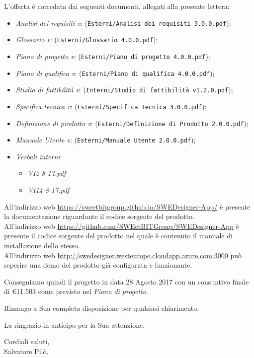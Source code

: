 	L'offerta è corredata dai seguenti documenti, allegati alla presente lettera:
	\begin{itemize}
		\item \emph{Analisi dei requisiti v\VersioneAR{}}: (\verb|Esterni/Analisi dei requisiti 3.0.0.pdf|);
		\item \emph{Glossario v\VersioneG{}}: (\verb|Esterni/Glossario 4.0.0.pdf|);
		\item \emph{Piano di progetto v\VersionePP{}}: (\verb|Esterni/Piano di progetto 4.0.0.pdf|);
		\item \emph{Piano di qualifica v\VersionePQ{}}: (\verb|Esterni/Piano di qualifica 4.0.0.pdf|);
		\item \emph{Studio di fattibilità v\VersioneSF{}}: (\verb|Interni/Studio di fattibilità v1.2.0.pdf|);
		\item \emph{Specifica tecnica v\VersioneST{}}: (\verb|Esterni/Specifica Tecnica 3.0.0.pdf|);
		\item \emph{Definizione di prodotto v\VersioneDP{}}: (\verb|Esterni/Definizione di Prodotto 2.0.0.pdf|);
		\item \emph{Manuale Utente v\VersioneMU{}}: (\verb|Esterni/Manuale Utente 2.0.0.pdf|);
		\item \emph{Verbali interni}:
		\begin{itemize}
			\item \emph{VI2-8-17.pdf}
			\item \emph{VI14-8-17.pdf}
		\end{itemize}
	\end{itemize}
	All'indirizzo web \url{https://sweetbitgroup.github.io/SWEDesigner-App/} è presente la documentazione riguardante il codice sorgente del prodotto.\\
	All'indirizzo web \url{https://github.com/SWEetBITGroup/SWEDesigner-App} è presente il codice sorgente del prodotto nel quale è contenuto il manuale
	di installazione dello stesso.\\
	All'indirizzo web \url{http://swedesigner.westeurope.cloudapp.azure.com:3000} può reperire una demo del prodotto già configurata e funzionante.

	Consegniamo quindi il progetto in data 28 Agosto 2017 con un consuntivo finale di \euro{11.503} come previsto nel \emph{Piano di progetto}.
	\begin{flushleft}
	\vspace{2cm}
		Rimango a Sua completa disposizione per qualsiasi chiarimento.
	\end{flushleft}
	\begin{flushleft}
		La ringrazio in anticipo per la Sua attenzione.
	\end{flushleft}
	\vspace{5mm}
	\begin{center}
		Cordiali saluti,\\
		\vspace{1cm}Salvatore Pilò.
	\end{center}
